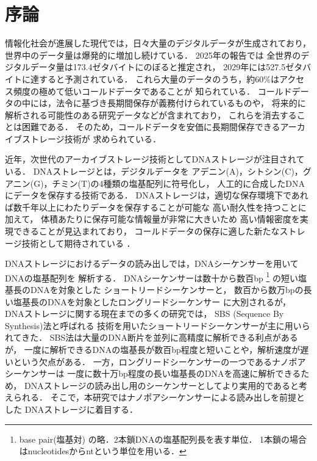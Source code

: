 \documentclass[sotsuron]{kuee}
\begin{document}
\chapter{序論}
情報化社会が進展した現代では，日々大量のデジタルデータが生成されており，
世界中のデータ量は爆発的に増加し続けている．
2025年の報告では
全世界のデジタルデータ量は173.4ゼタバイトにのぼると推定され，
2029年には527.5ゼタバイトに達すると予測されている\cite{statista_worldwide_data_created}．
これら大量のデータのうち，約60\%はアクセス頻度の極めて低いコールドデータであることが
知られている\cite{dna_data_storage_alliance_2021_intro}．
コールドデータの中には，法令に基づき長期間保存が義務付けられているものや，
将来的に解析される可能性のある研究データなどが含まれており，
これらを消去することは困難である．
そのため，コールドデータを安価に長期間保存できるアーカイブストレージ技術が
求められている\cite{reinsel2017dataage2025,dna_data_storage_alliance_2021_intro}．

近年，次世代のアーカイブストレージ技術としてDNAストレージが注目されている．
DNAストレージとは，デジタルデータを
アデニン(A)，シトシン(C)，グアニン(G)，チミン(T)の4種類の塩基配列に符号化し，
人工的に合成したDNAにデータを保存する技術である．
DNAストレージは，適切な保存環境下であれば数千年以上にわたりデータを保存することが可能な
高い耐久性を持つことに加えて，
体積あたりに保存可能な情報量が非常に大きいため
高い情報密度を実現できることが見込まれており，
コールドデータの保存に適した新たなストレージ技術として期待されている
\cite{akash2024_applicable,Ceze2019,dna_data_storage_alliance_2021_intro}．

DNAストレージにおけるデータの読み出しでは，DNAシーケンサーを用いてDNAの塩基配列を
解析する\cite{Ceze2019}．
DNAシーケンサーは数十から数百bp
\footnote{base pair(塩基対) の略．2本鎖DNAの塩基配列長を表す単位．
1本鎖の場合はnucleotidesからntという単位を用いる．}
の短い塩基長のDNAを対象とした
ショートリードシーケンサー\cite{Simon2009}と，
数百から数万bpの長い塩基長のDNAを対象としたロングリードシーケンサー \cite{Amarasinghe2020}に大別されるが，
DNAストレージに関する現在までの多くの研究では，
SBS (Sequence By Synthesis)法\cite{SBS}と呼ばれる
技術を用いたショートリードシーケンサーが主に用いられてきた．
SBS法は大量のDNA断片を並列に高精度に解析できる利点があるが，
一度に解析できるDNAの塩基長が数百bp程度と短いことや，解析速度が遅いという欠点がある\cite{SBS}．
一方，ロングリードシーケンサーの一つであるナノポアシーケンサーは
一度に数十万bp程度の長い塩基長のDNAを高速に解析できるため，
DNAストレージの読み出し用のシーケンサーとしてより実用的であると考えられる\cite{Amarasinghe2020}．
そこで，本研究ではナノポアシーケンサーによる読み出しを前提とした
DNAストレージに着目する．
\end{document}

